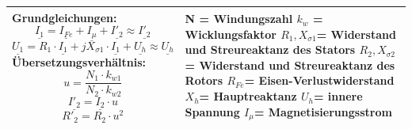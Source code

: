     \begin{longtable}{| p{} | p{}|}
        \hline
        \textbf{Grundgleichungen:}\newline
        \[ \underline{I_1}= \underline{I_{Fe}}+\underline{I_\mu}+\underline{I'_2} \approx \underline{I'_2} \]
        \[ \underline{U_1}= R_1 \cdot \underline{I_1}+jX_{\sigma 1}\cdot \underline{I_1}+ \underline{U_h} \approx \underline{U_h} \]
        \textbf{Übersetzungsverhältnis:}\newline
        \[ u=\frac{N_1 \cdot k_{w1}}{N_2 \cdot k_{w2}}\]
        \[ \underline{I'_2}=\underline{I_2} \cdot u \]
        \[ R'_2 = R_2 \cdot u^2 \]\vspace{-0.3cm}&
        N = Windungszahl \newline
        $ k_w $ = Wicklungsfaktor \newline
        $ R_1, X_{\sigma 1} $= Widerstand und Streureaktanz des Stators \newline
        $ R_2, X_{\sigma 2} $= Widerstand und Streureaktanz des Rotors \newline
        $ R_{Fe} $= Eisen-Verlustwiderstand \newline
        $ X_h $= Hauptreaktanz \newline
        $ U_h $= innere Spannung \newline
        $ I_\mu $= Magnetisierungsstrom
        \\ \hline      
    \end{longtable}
